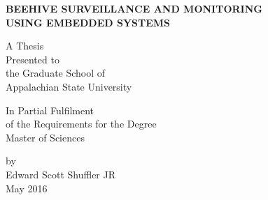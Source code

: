\thispagestyle{empty}

\vspace{1in}

\begin{center}
{\bf BEEHIVE SURVEILLANCE  AND MONITORING \\ USING EMBEDDED SYSTEMS}

\vspace{1in}

{A Thesis \\
Presented to \\
the Graduate School of \\
Appalachian State University}

\vspace{1in}

In Partial Fulfilment \\
of the Requirements for the Degree \\
Master of Sciences

\vspace{2in}

{by \\
Edward Scott Shuffler JR \\
May 2016}
\end{center}




